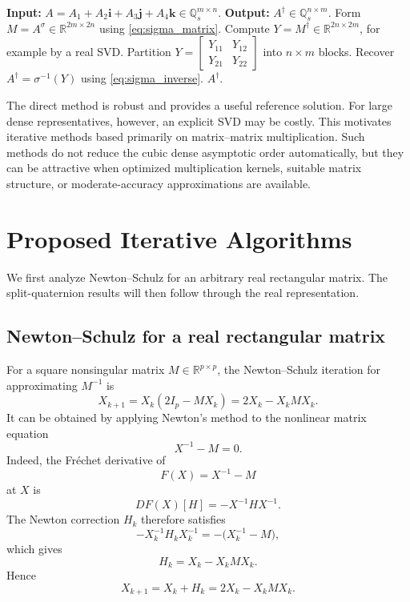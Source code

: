 \documentclass[12pt,a4paper]{article}
\theoremstyle{plain}
\theoremstyle{definition}
\theoremstyle{remark}
\begin{document}
\begin{algorithm}[H]
\caption{Direct computation of \(A^\dagger\) through the real representation.}
\label{MP_Alg}
\begin{algorithmic}[1]
\STATE \textbf{Input:} \(A=A_1+A_2\mathbf{i}+A_3\mathbf{j}+A_4\mathbf{k}\in\mathbb{Q}_s^{m\times n}\).
\STATE \textbf{Output:} \(A^\dagger\in\mathbb{Q}_s^{n\times m}\).
\STATE Form \(M=A^\sigma\in\mathbb{R}^{2m\times2n}\) using \eqref{eq:sigma_matrix}.
\STATE Compute \(Y=M^\dagger\in\mathbb{R}^{2n\times2m}\), for example by a real SVD.
\STATE Partition \(Y=\begin{bmatrix}Y_{11}&Y_{12}\\Y_{21}&Y_{22}\end{bmatrix}\) into \(n\times m\) blocks.
\STATE Recover \(A^\dagger=\sigma^{-1}(Y)\) using \eqref{eq:sigma_inverse}.
\RETURN \(A^\dagger\).
\end{algorithmic}
\end{algorithm}

The direct method is robust and provides a useful reference solution. For large dense representatives, however, an explicit SVD may be costly. This motivates iterative methods based primarily on matrix--matrix multiplication. Such methods do not reduce the cubic dense asymptotic order automatically, but they can be attractive when optimized multiplication kernels, suitable matrix structure, or moderate-accuracy approximations are available.

\section{Proposed Iterative Algorithms}
\label{Sec:pro}
We first analyze Newton--Schulz \cite{schulz1933iterative,ben2003generalized} for an arbitrary real rectangular matrix. The split-quaternion results will then follow through the real representation.

\subsection{Newton--Schulz for a real rectangular matrix}

For a square nonsingular matrix \(M\in\mathbb{R}^{p\times p}\), the Newton--Schulz iteration for approximating \(M^{-1}\) is
\begin{equation} \label{eq:NS-square}
    X_{k+1} = X_k(2I_p-MX_k) = 2X_k-X_kMX_k.
\end{equation}
It can be obtained by applying Newton's method to the nonlinear matrix
equation
\[
    X^{-1}-M=0.
\]
Indeed, the Fr\'echet derivative of
\[
    F(X)=X^{-1}-M
\]
at \(X\) is
\[
    DF(X)[H]=-X^{-1}HX^{-1}.
\]
The Newton correction \(H_k\) therefore satisfies
\[
    -X_k^{-1}H_kX_k^{-1} = -\bigl(X_k^{-1}-M\bigr),
\]
which gives
\[
    H_k=X_k-X_kMX_k.
\]
Hence
\[
    X_{k+1}=X_k+H_k=2X_k-X_kMX_k.
\]
\end{document}
